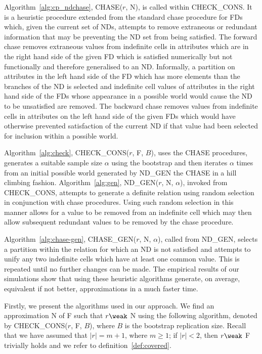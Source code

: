 Algorithm~\ref{alg:cp_ndchase}, CHASE($r$, N), is 
called within CHECK\_CONS. It is a heuristic procedure extended from the
standard chase procedure for FDs \cite{bv84,Mann92} which, given the
current set of NDs, attempts to remove extraneous or redundant information that
may be preventing the ND set from being satisfied. The forward chase removes extraneous values
from indefinite cells in attributes which are in the right hand
side of the given FD which is satisfied numerically but not functionally and 
therefore generalised to an ND.  Informally, a partition on attributes
in the left
hand side of the FD which has more elements than the branches of the ND is selected
and indefinite cell values of attributes in the right hand side of the
FDs whose appearance in a possible world would cause the ND to
be unsatisfied are removed. The backward chase removes values from
indefinite cells in attributes on the left hand side of the given
FDs which would have otherwise prevented satisfaction of the current
ND if that value had been selected for inclusion within a possible world.

\medskip

Algorithm~\ref{alg:check}, CHECK\_CONS($r$, F, $B$), uses the CHASE
procedures, generates a suitable sample size $\alpha$ using the bootstrap 
and then iterates $\alpha$ times from an initial possible world
generated by ND\_GEN the CHASE in a hill climbing fashion.
Algorithm~\ref{alg:gen}, ND\_GEN($r$, N, $\alpha$), invoked from
CHECK\_CONS, attempts to generate a definite relation using random
selection in conjunction with chase procedures. Using such random
selection in this manner allows for a value to be removed from an
indefinite cell which may then allow subsequent redundant values to be
removed by the chase procedure. 

Algorithm~\ref{alg:chase-gen}, CHASE\_GEN($r$, N, $\alpha$),
called from ND\_GEN, selects a partition within the relation for which
an ND is not satisfied and attempts to unify any two indefinite cells
which have at least one common value. This is repeated until no
further changes can be made. The empirical results of our simulations
show that using these heuristic algorithms generate, on average, equivalent
if not better, approximations in a much faster time.


Firstly, we present the algorithms used in our approach.
We find an approximation N of F such that $r \weak$ N
using the following algorithm, denoted by CHECK\_CONS($r$, F, $B$),
where $B$ is the bootstrap replication size.
Recall that we have assumed that $\mid r \mid = m+1$, where $m \ge 1$;
if $\mid r \mid < 2$, then $r \weak$ F trivially holds and we refer to
definition~\ref{def:covered}.

